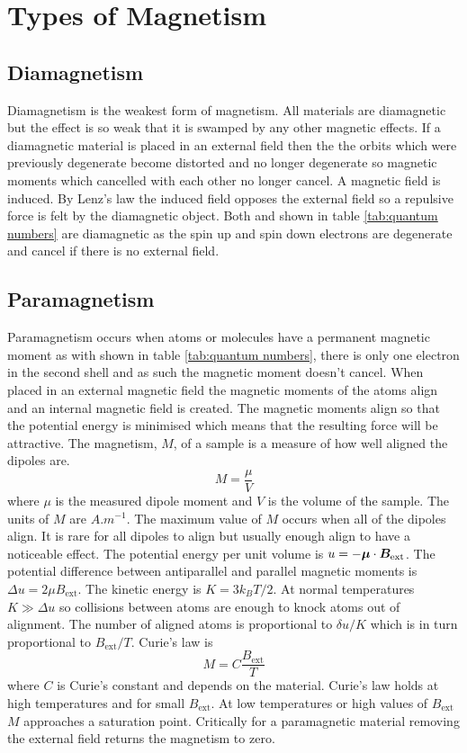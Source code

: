 \documentclass{article}
\begin{document}
    \section{Types of Magnetism}
    \subsection{Diamagnetism}
    Diamagnetism is the weakest form of magnetism.
    All materials are diamagnetic but the effect is so weak that it is swamped by any other magnetic effects.
    If a diamagnetic material is placed in an external field then the the orbits which were previously degenerate become distorted and no longer degenerate so magnetic moments which cancelled with each other no longer cancel.
    A magnetic field is induced.
    By Lenz's law the induced field opposes the external field so a repulsive force is felt by the diamagnetic object.
    Both  and  shown in table \ref{tab:quantum numbers} are diamagnetic as the spin up and spin down electrons are degenerate and cancel if there is no external field.
    
    \subsection{Paramagnetism}
    Paramagnetism occurs when atoms or molecules have a permanent magnetic moment as with  shown in table \ref{tab:quantum numbers}, there is only one electron in the second shell and as such the magnetic moment doesn't cancel.
    When placed in an external magnetic field the magnetic moments of the atoms align and an internal magnetic field is created.
    The magnetic moments align so that the potential energy is minimised which means that the resulting force will be attractive.
    The magnetism, \(M\), of a sample is a measure of how well aligned the dipoles are.
    \[M = \frac{\mu}{V}\]
    where \(\mu\) is the measured dipole moment and \(V\) is the volume of the sample.
    The units of \(M\) are \(\si{A.m^{-1}}\).
    The maximum value of \(M\) occurs when all of the dipoles align.
    It is rare for all dipoles to align but usually enough align to have a noticeable effect.
    The potential energy per unit volume is \(u = -\bm{\mu}\cdot\bm{B}_\text{ext}\).
    The potential difference between antiparallel and parallel magnetic moments is \(\Delta u = 2\mu B_\text{ext}\).
    The kinetic energy is \(K = 3k_BT/2\).
    At normal temperatures \(K\gg \Delta u\) so collisions between atoms are enough to knock atoms out of alignment.
    The number of aligned atoms is proportional to \(\delta u/K\) which is in turn proportional to \(B_\text{ext}/T\).
    Curie's law is
    \[M = C\frac{B_\text{ext}}{T}\]
    where \(C\) is Curie's constant and depends on the material.
    Curie's law holds at high temperatures and for small \(B_\text{ext}\).
    At low temperatures or high values of \(B_\text{ext}\) \(M\) approaches a saturation point.
    Critically for a paramagnetic material removing the external field returns the magnetism to zero.
    
\end{document}
